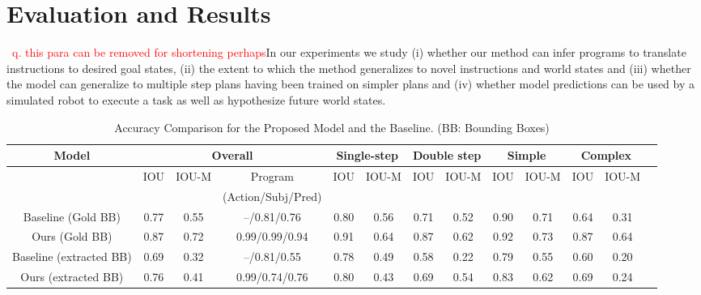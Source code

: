 \section{Evaluation and Results}\label{sec:evaluation}
%
~\textcolor{red}{q. this para can be removed for shortening perhaps}In our experiments we study (i) whether our method can infer 
programs to translate instructions to desired goal states, 
(ii) the extent to which the method generalizes to novel 
instructions and world states and (iii) whether the model 
can generalize to multiple step plans having been trained on 
simpler plans and (iv) whether model predictions can be used by a simulated 
robot to execute a task as well as hypothesize future world states. 

\begin{table}[ht]
    \centering
    \caption{Accuracy Comparison for the Proposed Model and the Baseline.  (BB: Bounding Boxes)}
    \begin{tabular}{|c|c|c|c|c|c|c|c|c|c|c|c|c|}
    \hline
         Model  & \multicolumn{3}{|c|}{Overall} &  \multicolumn{2}{|c|}{Single-step} & \multicolumn{2}{|c|}{Double step} & \multicolumn{2}{|c|}{Simple} & \multicolumn{2}{|c|}{Complex} \\ 
         \hline
         \hline
          & IOU & IOU-M & Program & IOU & IOU-M  & IOU & IOU-M  & IOU & IOU-M & IOU & IOU-M  \\
           &  &  & (Action/Subj/Pred) & &   &  & &  &  &  &   \\
          \hline
         Baseline (Gold BB) & 0.77 & 0.55 & --/0.81/0.76 & 0.80 & 0.56 &    0.71 & 0.52 &0.90 & 0.71 & 0.64 & 0.31\\ 
         \hline 
         Ours (Gold BB)  & 0.87 & 0.72& 0.99/0.99/0.94 & 0.91 & 0.64 &   0.87 & 0.62 & 0.92 & 0.73 & 0.87 & 0.64 \\
        \hline 
         Baseline (extracted BB) & 0.69 & 0.32& --/0.81/0.55 & 0.78 & 0.49 &  0.58 & 0.22 & 0.79 & 0.55 & 0.60 & 0.20\\ 
         \hline 
         Ours (extracted BB) & 0.76  & 0.41  & 0.99/0.74/0.76 &0.80 & 0.43  & 0.69 & 0.54  & 0.83 & 0.62 & 0.69 & 0.24\\
         \hline 
    \end{tabular}
    \label{tab:accuracy}
\end{table} 


